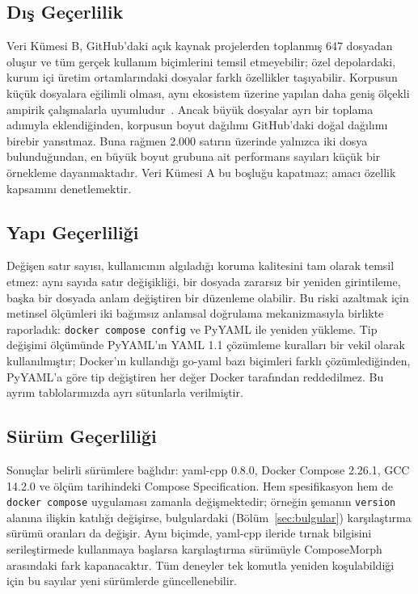 \documentclass[conference]{IEEEtran}
\begin{document}
\subsection{Dış Geçerlilik}
Veri Kümesi B, GitHub'daki açık kaynak projelerden toplanmış 647 dosyadan
oluşur ve tüm gerçek kullanım biçimlerini temsil etmeyebilir; özel
depolardaki, kurum içi üretim ortamlarındaki dosyalar farklı özellikler
taşıyabilir. Korpusun küçük dosyalara eğilimli olması, aynı ekosistem
üzerine yapılan daha geniş ölçekli ampirik çalışmalarla
uyumludur~\cite{ibrahim2021dockercompose,eng2024patterns}. Ancak büyük
dosyalar ayrı bir toplama adımıyla eklendiğinden, korpusun boyut dağılımı
GitHub'daki doğal dağılımı birebir yansıtmaz. Buna rağmen 2.000 satırın
üzerinde yalnızca iki dosya bulunduğundan, en büyük boyut grubuna ait
performans sayıları küçük bir örnekleme dayanmaktadır. Veri Kümesi A
bu boşluğu kapatmaz; amacı özellik kapsamını denetlemektir.

\subsection{Yapı Geçerliliği}
Değişen satır sayısı, kullanıcının algıladığı koruma kalitesini tam olarak
temsil etmez: aynı sayıda satır değişikliği, bir dosyada zararsız bir
yeniden girintileme, başka bir dosyada anlam değiştiren bir düzenleme
olabilir. Bu riski azaltmak için metinsel ölçümleri iki bağımsız anlamsal
doğrulama mekanizmasıyla birlikte raporladık: \texttt{docker compose config} ve PyYAML
ile yeniden yükleme. Tip değişimi ölçümünde PyYAML'ın YAML 1.1 çözümleme
kuralları bir vekil olarak kullanılmıştır; Docker'ın kullandığı go-yaml
bazı biçimleri farklı çözümlediğinden, PyYAML'a göre tip değiştiren her
değer Docker tarafından reddedilmez. Bu ayrım tablolarımızda ayrı
sütunlarla verilmiştir.

\subsection{Sürüm Geçerliliği}
Sonuçlar belirli sürümlere bağlıdır: yaml-cpp 0.8.0, Docker Compose
2.26.1, GCC 14.2.0 ve ölçüm tarihindeki Compose Specification. Hem
spesifikasyon hem de \texttt{docker compose} uygulaması zamanla
değişmektedir; örneğin şemanın \texttt{version} alanına ilişkin
katılığı değişirse, bulgulardaki (Bölüm~\ref{sec:bulgular}) karşılaştırma sürümü
oranları da değişir. Aynı biçimde, yaml-cpp ileride tırnak bilgisini serileştirmede
kullanmaya başlarsa karşılaştırma sürümüyle ComposeMorph arasındaki fark
kapanacaktır. Tüm deneyler tek komutla yeniden koşulabildiği için bu
sayılar yeni sürümlerde güncellenebilir.
\end{document}
